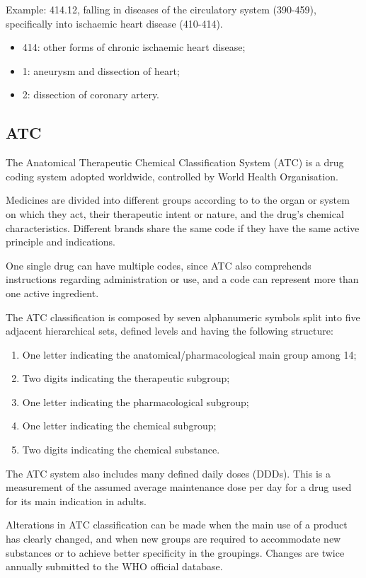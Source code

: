 Example: 414.12, falling in diseases of the circulatory system (390-459), specifically into ischaemic heart disease (410-414).
\begin{itemize}
	\item 414: other forms of chronic ischaemic heart disease;
		\item 1: aneurysm and dissection of heart;
			\item 2: dissection of coronary artery.
\end{itemize}

\subsection{ATC}
The Anatomical Therapeutic Chemical Classification System (ATC) is a drug coding system adopted worldwide, controlled by World Health Organisation.

Medicines are divided into different groups according to to the organ or system on which they act, their therapeutic intent or nature, and the drug's chemical characteristics. Different brands share the same code if they have the same active principle and indications.

One single drug can have multiple codes, since ATC also comprehends instructions regarding administration or use, and a code can represent more than one active ingredient.

The ATC classification is composed by seven alphanumeric symbols split into five adjacent hierarchical sets, defined levels and having the following structure\cite{atclevels}:
\begin{enumerate}
	\item One letter indicating the anatomical/pharmacological main group among 14;
	\item Two digits indicating the therapeutic subgroup;
	\item One letter indicating the pharmacological subgroup;
	\item One letter indicating the chemical subgroup;
	\item Two digits indicating the chemical substance.
\end{enumerate}

The ATC system also includes many defined daily doses (DDDs). This is a measurement of the assumed average maintenance dose per day for a drug used for its main indication in adults.

Alterations in ATC classification can be made when the main use of a product has clearly changed, and when new groups are required to accommodate new substances or to achieve better specificity in the groupings. Changes are twice annually submitted to the WHO official database.

